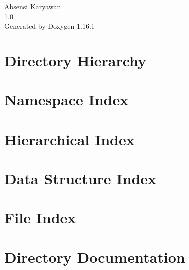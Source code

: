 \documentclass[twoside]{book}
\newcommand{\+}{\discretionary{\mbox{\scriptsize$\hookleftarrow$}}{}{}}
\newcommand{\clearemptydoublepage}{%
    \newpage{\pagestyle{empty}\cleardoublepage}%
  }
\begin{document}
  \raggedbottom
    \hypersetup{pageanchor=false,
                bookmarksnumbered=true,
                pdfencoding=unicode
               }
  \begin{titlepage}
  \vspace*{7cm}
  \begin{center}%
  {\Large Absensi Karyawan}\\
  [1ex]\large 1.\+0 \\
  \vspace*{1cm}
  {\large Generated by Doxygen 1.16.1}\\
  \end{center}
  \end{titlepage}
  \clearemptydoublepage
  \tableofcontents
  \clearemptydoublepage
  \hypersetup{pageanchor=true}
\chapter{Directory Hierarchy}

\chapter{Namespace Index}

\chapter{Hierarchical Index}

\chapter{Data Structure Index}

\chapter{File Index}

\chapter{Directory Documentation}

















\end{document}
